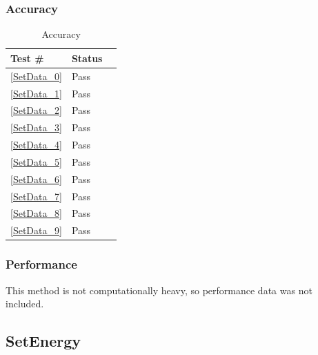 \documentclass[12pt]{article}
\begin{document}
	\subsubsection{Accuracy}
		\begin{table}[H]
		\centering
		\caption{Accuracy}\label{GetY_acc}
		\begin{tabular}{lll}
		\toprule
		\bf Test \# & Status \\\midrule
		\ref{SetData_0} & Pass\\
		\ref{SetData_1} & Pass\\
		\ref{SetData_2} & Pass\\
		\ref{SetData_3} & Pass\\
		\ref{SetData_4} & Pass\\
		\ref{SetData_5} & Pass\\
		\ref{SetData_6} & Pass\\
		\ref{SetData_7} & Pass\\
		\ref{SetData_8} & Pass\\
		\ref{SetData_9} & Pass\\
		\bottomrule
		\end{tabular}
		\end{table}
	\subsubsection{Performance}
		This method is not computationally heavy, so performance data was not included.
		
\subsection{SetEnergy}
\end{document}

